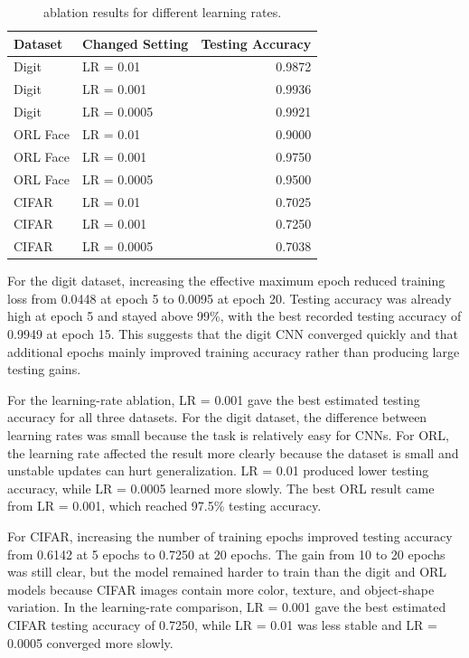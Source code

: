 \documentclass[10pt]{article}
\begin{document}
\begin{table}[H]
\centering
\renewcommand{\arraystretch}{1.05}
\begin{tabular}{l l r}
\toprule
Dataset & Changed Setting & Testing Accuracy \\
\midrule
Digit & LR = 0.01 & 0.9872 \\
Digit & LR = 0.001 & 0.9936 \\
Digit & LR = 0.0005 & 0.9921 \\
ORL Face & LR = 0.01 & 0.9000 \\
ORL Face & LR = 0.001 & 0.9750 \\
ORL Face & LR = 0.0005 & 0.9500 \\
CIFAR & LR = 0.01 & 0.7025 \\
CIFAR & LR = 0.001 & 0.7250 \\
CIFAR & LR = 0.0005 & 0.7038 \\
\bottomrule
\end{tabular}
\caption{ ablation results for different learning rates.}
\end{table}

For the digit dataset, increasing the effective maximum epoch reduced training loss from 0.0448 at epoch 5 to 0.0095 at epoch 20. Testing accuracy was already high at epoch 5 and stayed above 99\%, with the best recorded testing accuracy of 0.9949 at epoch 15. This suggests that the digit CNN converged quickly and that additional epochs mainly improved training accuracy rather than producing large testing gains.

For the learning-rate ablation, LR = 0.001 gave the best estimated testing accuracy for all three datasets. For the digit dataset, the difference between learning rates was small because the task is relatively easy for CNNs. For ORL, the learning rate affected the result more clearly because the dataset is small and unstable updates can hurt generalization. LR = 0.01 produced lower testing accuracy, while LR = 0.0005 learned more slowly. The best ORL result came from LR = 0.001, which reached 97.5\% testing accuracy.

For CIFAR, increasing the number of training epochs improved testing accuracy from 0.6142 at 5 epochs to 0.7250 at 20 epochs. The gain from 10 to 20 epochs was still clear, but the model remained harder to train than the digit and ORL models because CIFAR images contain more color, texture, and object-shape variation. In the learning-rate comparison, LR = 0.001 gave the best estimated CIFAR testing accuracy of 0.7250, while LR = 0.01 was less stable and LR = 0.0005 converged more slowly.
\end{document}
